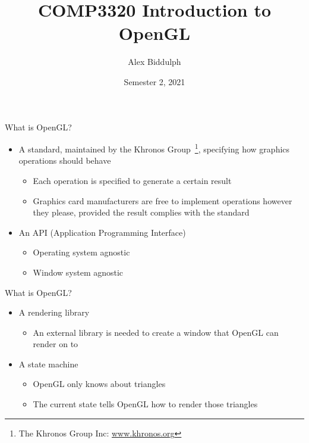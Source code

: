 \documentclass{beamer}
\title{COMP3320 Introduction to OpenGL}
\author{Alex Biddulph}
\institute{
    The University of Newcastle, Australia
    \and
    Based on the work provided at \url{www.learnopengl.com}
}
\date{Semester 2, 2021}
\begin{document}
\begin{frame}
    \titlepage
\end{frame}

\begin{frame}{What is OpenGL?}
    \begin{itemize}
        \item A standard, maintained by the Khronos Group~\footnote{The Khronos Group Inc: \url{www.khronos.org}},
              specifying how graphics operations should behave
              \begin{itemize}
                  \item Each operation is specified to generate a certain result
                  \item Graphics card manufacturers are free to implement operations however they please, provided the result
                        complies with the standard
              \end{itemize}
        \item An API (Application Programming Interface)
              \begin{itemize}
                  \item Operating system agnostic
                  \item Window system agnostic
              \end{itemize}
    \end{itemize}
\end{frame}

\begin{frame}{What is OpenGL?}
    \begin{itemize}
        \item A rendering library
              \begin{itemize}
                  \item An external library is needed to create a window that OpenGL can render on to
              \end{itemize}
        \item A state machine
              \begin{itemize}
                  \item OpenGL only knows about triangles
                  \item The current state tells OpenGL how to render those triangles
              \end{itemize}
    \end{itemize}
\end{frame}
\end{document}
